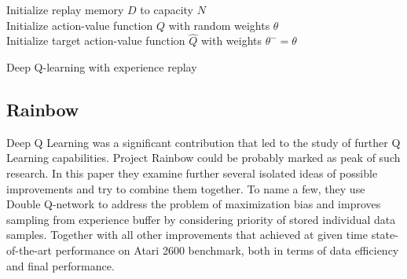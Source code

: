 \begin{algorithm}
  Initialize replay memory $D$ to capacity $N$ \\
  Initialize action-value function $Q$ with random weights $\theta$ \\
  Initialize target action-value function $\hat{Q}$ with weights $\theta^- = \theta $\\
  
  \caption{Deep Q-learning with experience replay}
  \label{DeepQLearning}
\end{algorithm}

\subsection*{Rainbow}
Deep Q Learning was a significant contribution that led to the study of further Q Learning capabilities.
Project Rainbow \cite{Rainbow} could be probably marked as peak of such research.
In this paper they examine further several isolated ideas of possible improvements and try to combine them together.
To name a few, they use Double Q-network to address the problem of maximization bias and improves sampling from experience buffer by considering priority of stored individual data samples.
Together with all other improvements that achieved at given time state-of-the-art performance on Atari 2600 benchmark, both in terms of data efficiency and final performance.








